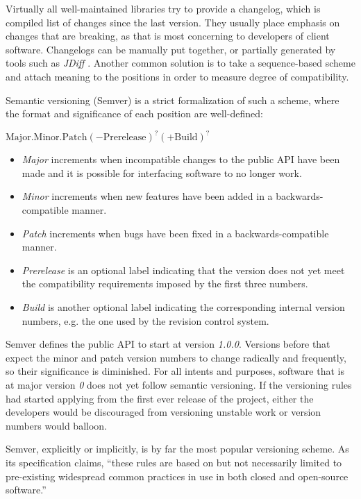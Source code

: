 \documentclass{l4proj}
\begin{document}
Virtually all well-maintained libraries try to provide a changelog,
which is compiled list of changes since the last version. They usually
place emphasis on changes that are breaking, as that is most
concerning to developers of client software. Changelogs can be
manually put together, or partially generated by tools such as
\textit{JDiff} \cite{JDiff}. Another common solution is to take a
sequence-based scheme and attach meaning to the positions in order to
measure degree of compatibility.

Semantic versioning \cite{SemanticVersioning} (Semver) is a strict
formalization of such a scheme, where the format and significance of
each position are well-defined:

\begin{center}
$\mathrm{Major.Minor.Patch}(-\mathrm{Prerelease})^?(+\mathrm{Build})^?$
\end{center}

\begin{itemize}
\item \textit{Major} increments when incompatible changes to the
public API have been made and it is possible for interfacing software
to no longer work.
\item \textit{Minor} increments when new features have been added in a
backwards-compatible manner.
\item \textit{Patch} increments when bugs have been fixed in a
backwards-compatible manner.
\item \textit{Prerelease} is an optional label indicating that the
version does not yet meet the compatibility requirements imposed by
the first three numbers.
\item \textit{Build} is another optional label indicating the
corresponding internal version numbers, e.g. the one used by the
revision control system.
\end{itemize}

Semver defines the public API to start at version \textit{1.0.0}.
Versions before that expect the minor and patch version numbers to
change radically and frequently, so their significance is diminished.
For all intents and purposes, software that is at major version
\textit{0} does not yet follow semantic versioning.
If the versioning rules had started applying from the first ever
release of the project, either the developers would be discouraged
from versioning unstable work or version numbers would balloon.

Semver, explicitly or implicitly, is by far the most popular
versioning scheme. As its specification claims, ``these rules are
based on but not necessarily limited to pre-existing widespread common
practices in use in both closed and open-source software.''
\end{document}
